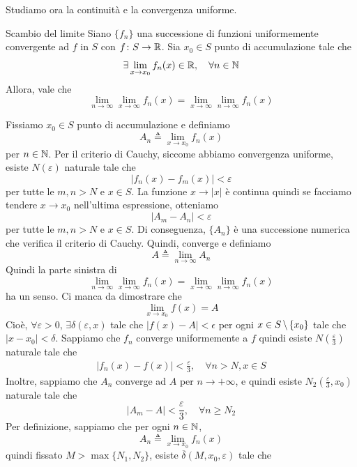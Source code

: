 \documentclass[a4paper]{article}
\begin{document}
Studiamo ora la continuità e la convergenza uniforme.

\begin{snippettheorem}{Scambio del limite}
    Siano \(\{f_n\}\) una successione di funzioni uniformemente convergente ad \(f\)
    in \(S\) con \(f \colon S \to \mathbb{R}\).
    Sia \(x_0 \in S\) punto di accumulazione tale che
    \[
        \exists \lim_{x\to x_0} f_n(x) \in \mathbb{R}, \quad \forall n \in \mathbb{N}
    \]
    Allora, vale che
    \[
        \lim_{n \to \infty} \lim_{x \to \infty} f_n(x)
        = \lim_{x \to \infty} \lim_{n \to \infty} f_n(x)
    \]
\end{snippettheorem}

\begin{snippetproof}{}
    Fissiamo \(x_0 \in S\) punto di accumulazione
    e definiamo \[ A_n \triangleq \lim_{x \to x_0} f_n(x) \] per \(n \in \mathbb{N}\).
    Per il criterio di Cauchy, siccome abbiamo convergenza uniforme,
    esiste \(N(\varepsilon)\) naturale tale che
    \[
        |f_n(x) - f_m(x)| < \varepsilon
    \]
    per tutte le \(m,n > N\) e \(x \in S\).
    La funzione \(x \to |x|\) è continua quindi se
    facciamo tendere \(x \to x_0\) nell'ultima espressione,
    otteniamo
    \[
        |A_m - A_n| < \varepsilon
    \]
    per tutte le \(m,n > N\) e \(x \in S\).
    Di conseguenza, \(\{A_n\}\) è una successione numerica che verifica il criterio di Cauchy.
    Quindi, converge e definiamo
    \[
        A \triangleq \lim_{n \to \infty} A_n
    \]
    Quindi la parte sinistra di 
        \[
        \lim_{n \to \infty} \lim_{x \to \infty} f_n(x)
        = \lim_{x \to \infty} \lim_{n \to \infty} f_n(x)
    \]
    ha un senso. Ci manca da dimostrare che
    \[
        \lim_{x\to x_0} f(x) = A
    \]
    Cioè, \(\forall \varepsilon > 0\), \(\exists \delta(\varepsilon, x)\)
    tale che \(|f(x) - A| < \epsilon\) per ogni \(x\in S \,\backslash\, \{x_0\}\) tale che \(|x-x_0| < \delta\).
    Sappiamo che \(f_n\) converge uniformemente a \(f\) quindi esiste \(N\left(\frac{\varepsilon}{3}\right)\)
    naturale tale che
    \begin{align*}
        |f_n(x) - f(x)| < \frac{\varepsilon}{3}, \quad \forall n > N, x \in S
    \end{align*}
    Inoltre, sappiamo che \(A_n\) converge ad \(A\) per \(n \to +\infty\),
    e quindi esiste \(N_2\left(\frac{\varepsilon}{3}, x_0\right)\) naturale tale che 
    \[
        |A_m - A| < \frac{\varepsilon}{3}, \quad \forall n \geq N_2
    \]
    Per definizione, sappiamo che per ogni \(n \in \mathbb{N}\),
    \[
        A_n \triangleq \lim_{x\to x_0} f_n(x)
    \]
    quindi fissato \(M > \max\{N_1, N_2\}\), esiste
    \(\overline\delta(M, x_0, \varepsilon)\) tale che
    

\end{snippetproof}
\end{document}
